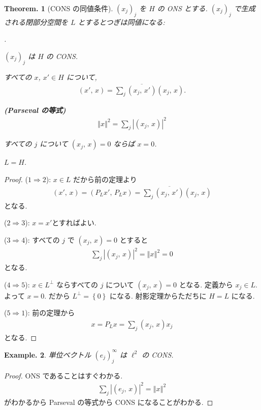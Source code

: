 \documentclass[openany, a4paper, oneside]{jsbook}
\newcounter{enum2}
\renewenvironment{enumerate}{%
\begin{list}%
{%
\arabic{enum2}.\ \,%
}%
{%
\usecounter{enum2}
\setlength{\itemindent}{0pt}%
\setlength{\leftmargin}{15pt}%
\setlength{\rightmargin}{0pt}%
\setlength{\labelsep}{0pt}%
\setlength{\labelwidth}{6pt}%
\setlength{\itemsep}{0pt}%
\setlength{\parsep}{0pt}%
\setlength{\listparindent}{0pt}%
}
}{%
\end{list}%
}
\theoremstyle{break}
\theoremstyle{breakdefn}
\newtheorem{thm}{Theorem.}[section]
\newtheorem{ex}[thm]{Example.}
\newcommand{\abs}[1]{\left|#1\right|}
\newcommand{\norm}[1]{\left\Vert#1\right\Vert}
\newcommand{\cbk}[1]{\left\{#1\right\}}
\newcommand{\rbkt}[2]{\left ( #1,\,#2 \right)}
\newcommand{\upbf}[1]{\textup{\textbf{#1}}}
\begin{document}
\begin{thm}[CONS の同値条件]
 $(x_j)_j$  を $H$ の ONS とする.
 $(x_j)_j$ で生成される閉部分空間を $L$ とするとつぎは同値になる:
\begin{enumerate}
\item $(x_j)_j$ は $H$ の CONS.
\item すべての $x$, $x' \in H$ について,
    \begin{align}
     \rbkt{x'}{x}
     =
     \sum_j \overline{\rbkt{x_j}{x'}} \rbkt{x_j}{x}.
    \end{align}
\item \upbf{(Parseval の等式)}
    \begin{align}
     \norm{x}^2
     =
     \sum_j \abs{\rbkt{x_j}{x}}^2
    \end{align}
\item すべての $j$ について $\rbkt{x_j}{x} = 0$ ならば $x=0$.
\item $L=H$.
\end{enumerate}
\end{thm}
\begin{proof}
(\textbf{$1 \Rightarrow 2$}):
$x \in L$ だから前の定理より
\begin{align}
 \rbkt{x'}{x}
 =
 \rbkt{P_L x'}{P_L x}
 =
 \sum_j \overline{\rbkt{x_j}{x'}} \rbkt{x_j}{x}
\end{align}
となる.

(\textbf{$2 \Rightarrow 3$}):
$x = x'$とすればよい.

(\textbf{$3 \Rightarrow 4$}):
すべての $j$ で $\rbkt{x_j}{x} = 0$ とすると
\begin{align}
 \sum_j \abs{\rbkt{x_j}{x}}^2
 =
 \norm{x}^2
 =
 0
\end{align}
となる.

(\textbf{$4 \Rightarrow 5$}):
$x \in L^{\perp}$ ならすべての $j$ について $\rbkt{x_j}{x} = 0$ となる.
定義から $x_j \in L$.
よって $x=0$.
だから $L^{\perp} = \cbk{0}$ になる.
射影定理からただちに $H=L$ になる.

(\textbf{$5 \Rightarrow 1$}):
前の定理から
\begin{align}
 x
 =
 P_L x
 =
 \sum_j \rbkt{x_j}{x} x_j
\end{align}
となる.
\end{proof}

\begin{ex}
単位ベクトル
$(e_j)_j^{\infty}$ は $\ell^2$ の CONS.
\end{ex}
\begin{proof}
ONS であることはすぐわかる.
\begin{align}
 \sum_j \abs{\rbkt{e_j}{x}}^2
 =
 \norm{x}^2
\end{align}
がわかるから Parseval の等式から CONS になることがわかる.
\end{proof}
\end{document}
